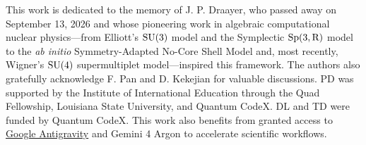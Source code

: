 \documentclass[aps,onecolumn,10pt,superscriptaddress,floatfix,nofootinbib]{revtex4}
\begin{document}
\begin{acknowledgments}
This work is dedicated to the memory of J. P. Draayer, who passed away on September 13, 2026 and whose pioneering work in algebraic computational nuclear physics---from Elliott's $\rm SU(3)$ model and the Symplectic $\rm Sp(3,R)$ model to the \textit{ab initio} Symmetry-Adapted No-Core Shell Model and, most recently, Wigner's $\rm SU(4)$ supermultiplet model---inspired this framework.
The authors also gratefully acknowledge F. Pan and D. Kekejian for valuable discussions. PD was supported by the Institute of International Education through the Quad Fellowship, Louisiana State University, and Quantum CodeX. DL and TD were funded by Quantum CodeX. This work also benefits from granted access to \href{https://antigravity.google/use-cases/science}{Google Antigravity} and Gemini 4 Argon to accelerate scientific workflows.
\end{acknowledgments}
\end{document}
